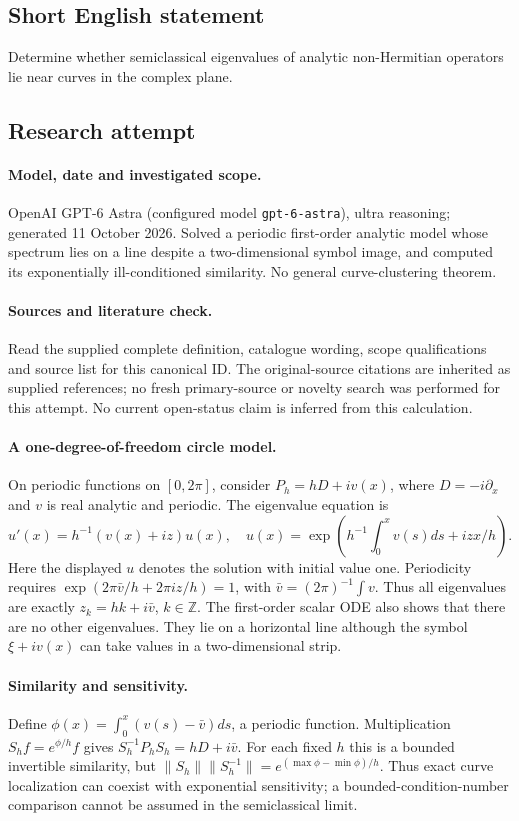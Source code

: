 \documentclass[11pt]{article}
\begin{document}
\subsection{Short English statement}
Determine whether semiclassical eigenvalues of analytic non-Hermitian operators lie near curves in the complex plane.
\subsection{Research attempt}
\paragraph{Model, date and investigated scope.}
OpenAI GPT-6 Astra (configured model \texttt{gpt-6-astra}), ultra reasoning; generated 11 October 2026. Solved a periodic first-order analytic model whose spectrum lies on a line despite a two-dimensional symbol image, and computed its exponentially ill-conditioned similarity. No general curve-clustering theorem.

\paragraph{Sources and literature check.}
Read the supplied complete definition, catalogue wording, scope qualifications and source list for this canonical ID. The original-source citations are inherited as supplied references; no fresh primary-source or novelty search was performed for this attempt. No current open-status claim is inferred from this calculation.

\paragraph{A one-degree-of-freedom circle model.}On periodic functions on \([0,2\pi]\), consider \(P_h=hD+iv(x)\), where \(D=-i\partial_x\) and \(v\) is real analytic and periodic. The eigenvalue equation is
\[u'(x)=h^{-1}(v(x)+iz)u(x),\quad
u(x)=\exp\left(h^{-1}\int_0^xv(s)ds+izx/h\right).
\]
Here the displayed \(u\) denotes the solution with initial value one. Periodicity requires \(\exp(2\pi\bar v/h+2\pi iz/h)=1\), with \(\bar v=(2\pi)^{-1}\int v\). Thus all eigenvalues are exactly \(z_k=hk+i\bar v\), \(k\in\mathbb Z\). The first-order scalar ODE also shows that there are no other eigenvalues. They lie on a horizontal line although the symbol \(\xi+iv(x)\) can take values in a two-dimensional strip.
\paragraph{Similarity and sensitivity.}Define \(\phi(x)=\int_0^x(v(s)-\bar v)ds\), a periodic function. Multiplication \(S_hf=e^{\phi/h}f\) gives \(S_h^{-1}P_hS_h=hD+i\bar v\). For each fixed \(h\) this is a bounded invertible similarity, but \(\|S_h\|\|S_h^{-1}\|=e^{(\max\phi-\min\phi)/h}\). Thus exact curve localization can coexist with exponential sensitivity; a bounded-condition-number comparison cannot be assumed in the semiclassical limit.
\end{document}
